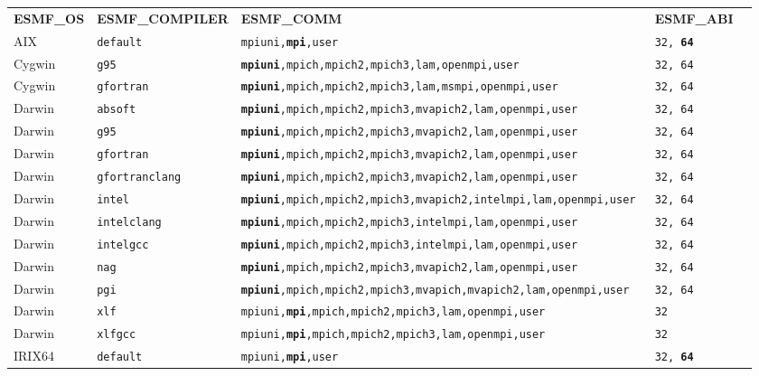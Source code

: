 \begin{longtable}{lllll}
  {\bfseries\footnotesize ESMF\_OS} &{\bfseries\footnotesize ESMF\_COMPILER} & {\bfseries\footnotesize ESMF\_COMM} & {\bfseries\footnotesize ESMF\_ABI} \\

AIX     &\tt default     &\footnotesize \tt mpiuni,{\bf mpi},user      &\tt 32, {\bf 64} \\
Cygwin  &\tt g95         &\footnotesize \tt {\bf mpiuni},mpich,mpich2,mpich3,lam,openmpi,user &\tt 32, 64 \\
Cygwin  &\tt gfortran    &\footnotesize \tt {\bf mpiuni},mpich,mpich2,mpich3,lam,msmpi,openmpi,user &\tt 32, 64 \\
Darwin  &\tt absoft      &\footnotesize \tt {\bf mpiuni},mpich,mpich2,mpich3,mvapich2,lam,openmpi,user &\tt 32, 64 \\
Darwin  &\tt g95         &\footnotesize \tt {\bf mpiuni},mpich,mpich2,mpich3,mvapich2,lam,openmpi,user &\tt 32, 64 \\
Darwin  &\tt gfortran    &\footnotesize \tt {\bf mpiuni},mpich,mpich2,mpich3,mvapich2,lam,openmpi,user &\tt 32, 64 \\
Darwin  &\tt gfortranclang &\footnotesize \tt {\bf mpiuni},mpich,mpich2,mpich3,mvapich2,lam,openmpi,user &\tt 32, 64 \\
Darwin  &\tt intel       &\footnotesize \tt {\bf mpiuni},mpich,mpich2,mpich3,mvapich2,intelmpi,lam,openmpi,user &\tt 32, 64 \\
Darwin  &\tt intelclang  &\footnotesize \tt {\bf mpiuni},mpich,mpich2,mpich3,intelmpi,lam,openmpi,user &\tt 32, 64 \\
Darwin  &\tt intelgcc    &\footnotesize \tt {\bf mpiuni},mpich,mpich2,mpich3,intelmpi,lam,openmpi,user &\tt 32, 64 \\
Darwin  &\tt nag         &\footnotesize \tt {\bf mpiuni},mpich,mpich2,mpich3,mvapich2,lam,openmpi,user &\tt 32, 64 \\
Darwin  &\tt pgi         &\footnotesize \tt {\bf mpiuni},mpich,mpich2,mpich3,mvapich,mvapich2,lam,openmpi,user &\tt 32, 64 \\
Darwin  &\tt xlf         &\footnotesize \tt mpiuni,{\bf mpi},mpich,mpich2,mpich3,lam,openmpi,user &\tt 32 \\
Darwin  &\tt xlfgcc      &\footnotesize \tt mpiuni,{\bf mpi},mpich,mpich2,mpich3,lam,openmpi,user &\tt 32 \\
IRIX64  &\tt default     &\footnotesize \tt mpiuni,{\bf mpi},user     &\tt 32, {\bf 64} \\

\end{longtable}
